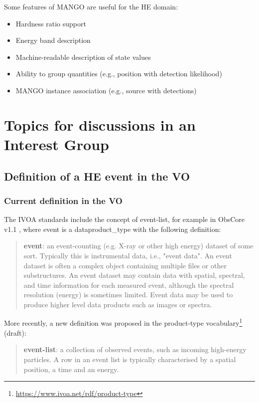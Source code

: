 \documentclass[11pt,a4paper]{ivoa}
\begin{document}
{Some features of MANGO are useful for the HE domain:
 \begin{itemize}
     \item Hardness ratio support
     \item Energy band description
     \item Machine-readable description of state values
     \item Ability to group quantities (e.g., position with detection likelihood)
     \item MANGO instance association (e.g., source with detections)
\end{itemize}


\section{Topics for discussions in an Interest Group}

\subsection{Definition of a HE event in the VO}
\label{sec:event-bundlle-or-list}

\subsubsection{Current definition in the VO}

The IVOA standards include the concept of event-list, for example in ObsCore v1.1 \citep{2017ivoa.spec.0509L}, where
event is a dataproduct\_type with the following definition:
\begin{quote}
    \textbf{event}: an event-counting (e.g. X-ray or other high energy) dataset of some sort. Typically this is
    instrumental data, i.e., "event data". An event dataset is often a complex object containing multiple files or
    other substructures. An event dataset may contain data with spatial, spectral, and time information for each
    measured event, although the spectral resolution (energy) is sometimes limited. Event data may be used to produce
    higher level data products such as images or spectra.
\end{quote}

More recently, a new definition was proposed in the product-type vocabulary\footnote{\url{https://www.ivoa.net/rdf/product-type}} (draft):
\begin{quote}
    \textbf{event-list}: a collection of observed events, such as incoming high-energy particles. A row in an event
    list is typically characterised by a spatial position, a time and an energy.
\end{quote}

}
\end{document}
